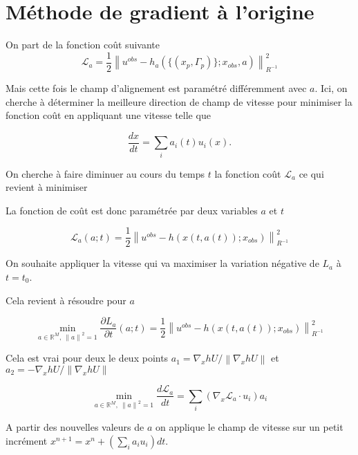 \documentclass{article}
\newcommand{\norm}[1]{\left\lVert #1 \right\rVert}
\begin{document}
\section{Méthode de gradient à l'origine}

On part de la fonction coût suivante
\begin{equation*}
    \mathcal L_a =  \frac12 \norm{u^{obs} - h_a(\{(x_p, \Gamma_p)\}; x_{obs}, a)}^2_{R^{-1}}
\end{equation*}

Mais cette fois le champ d'alignement est paramétré différemment avec $a$.
Ici, on cherche à déterminer la meilleure direction de champ de vitesse pour minimiser la fonction coût en appliquant une vitesse telle que

\begin{equation*}
    \frac{dx}{dt} = \sum_i a_i(t) u_i(x).
\end{equation*}

On cherche à faire diminuer au cours du temps $t$ la fonction coût $\mathcal L_a$ ce qui revient à minimiser

La fonction de coût est donc paramétrée par deux variables $a$ et $t$

\begin{equation*}
    \mathcal L_a(a;t) =  \frac12 \norm{u^{obs} - h(x(t,a(t)); x_{obs})}^2_{R^{-1}}
\end{equation*}

On souhaite appliquer la vitesse qui va maximiser la variation négative de $L_a$ à $t=t_0$.

Cela revient à résoudre pour $a$

\begin{equation*}
    \min_{a\in \mathbb{R}^M,~\norm{a}^2 = 1} \frac{\partial L_a}{\partial t}(a;t) =  \frac12 \norm{u^{obs} - h(x(t,a(t)); x_{obs})}^2_{R^{-1}}
\end{equation*}

Cela est vrai pour deux le deux points $a_1 = \nabla_x h U / \norm{\nabla_x h U }$ et $a_2 = - \nabla_x h U / \norm{\nabla_x h U }$

\begin{equation*}
    \min_{a \in \mathbb{R}^M,~\norm{a}^2 = 1} \frac{d \mathcal L_a}{dt} = \sum_i (\nabla_x \mathcal L_a \cdot u_i ) a_i
\end{equation*}

A partir des nouvelles valeurs de $a$ on applique le champ de vitesse sur un petit incrément $x^{n+1} = x^n + \left(\sum_i a_i u_i\right) dt$.
\end{document}
